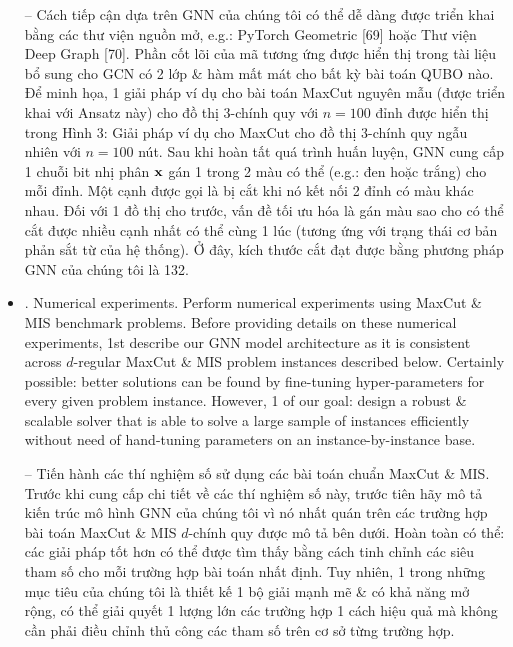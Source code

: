 \documentclass{article}
\begin{document}
\begin{itemize}
    -- Cách tiếp cận dựa trên GNN của chúng tôi có thể dễ dàng được triển khai bằng các thư viện nguồn mở, e.g.: PyTorch Geometric [69] hoặc Thư viện Deep Graph [70]. Phần cốt lõi của mã tương ứng được hiển thị trong tài liệu bổ sung cho GCN có 2 lớp \& hàm mất mát cho bất kỳ bài toán QUBO nào. Để minh họa, 1 giải pháp ví dụ cho bài toán MaxCut nguyên mẫu (được triển khai với Ansatz này) cho đồ thị 3-chính quy với $n = 100$ đỉnh được hiển thị trong {\sf Hình 3: Giải pháp ví dụ cho MaxCut cho đồ thị 3-chính quy ngẫu nhiên với $n = 100$ nút. Sau khi hoàn tất quá trình huấn luyện, GNN cung cấp 1 chuỗi bit nhị phân ${\bf x}$ gán 1 trong 2 màu có thể (e.g.: đen hoặc trắng) cho mỗi đỉnh. Một cạnh được gọi là bị cắt khi nó kết nối 2 đỉnh có màu khác nhau. Đối với 1 đồ thị cho trước, vấn đề tối ưu hóa là gán màu sao cho có thể cắt được nhiều cạnh nhất có thể cùng 1 lúc (tương ứng với trạng thái cơ bản phản sắt từ của hệ thống).} Ở đây, kích thước cắt đạt được bằng phương pháp GNN của chúng tôi là 132.
    \item {. Numerical experiments.} Perform numerical experiments using MaxCut \& MIS benchmark problems. Before providing details on these numerical experiments, 1st describe our GNN model architecture as it is consistent across $d$-regular MaxCut \& MIS problem instances described below. Certainly possible: better solutions can be found by fine-tuning hyper-parameters for every given problem instance. However, 1 of our goal: design a robust \& scalable solver that is able to solve a large sample of instances efficiently without need of hand-tuning parameters on an instance-by-instance base.

    -- Tiến hành các thí nghiệm số sử dụng các bài toán chuẩn MaxCut \& MIS. Trước khi cung cấp chi tiết về các thí nghiệm số này, trước tiên hãy mô tả kiến trúc mô hình GNN của chúng tôi vì nó nhất quán trên các trường hợp bài toán MaxCut \& MIS $d$-chính quy được mô tả bên dưới. Hoàn toàn có thể: các giải pháp tốt hơn có thể được tìm thấy bằng cách tinh chỉnh các siêu tham số cho mỗi trường hợp bài toán nhất định. Tuy nhiên, 1 trong những mục tiêu của chúng tôi là thiết kế 1 bộ giải mạnh mẽ \& có khả năng mở rộng, có thể giải quyết 1 lượng lớn các trường hợp 1 cách hiệu quả mà không cần phải điều chỉnh thủ công các tham số trên cơ sở từng trường hợp.


\end{itemize}
\end{document}
